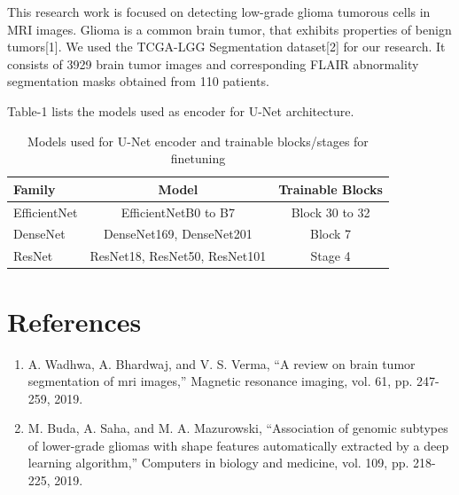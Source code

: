 \documentclass{article}
\begin{document}
This research work is focused on detecting low-grade glioma tumorous cells in MRI images. Glioma is a common brain tumor, that exhibits properties of benign tumors[1]. We used the TCGA-LGG Segmentation dataset[2] for our research. It consists of 3929 brain tumor images and corresponding FLAIR abnormality segmentation masks obtained from 110 patients.

Table-1  lists the models used as encoder for U-Net architecture.
 \begin{table}
    \centering
    \caption{Models used for U-Net encoder and trainable blocks/stages for finetuning}
    \begin{tabular}{l c c}
    \hline
    Family & Model & Trainable Blocks \\
    \hline
    EfficientNet & EfficientNetB0 to B7 & Block 30 to 32\\
    DenseNet & DenseNet169, DenseNet201 & Block 7\\
    ResNet &  ResNet18, ResNet50, ResNet101 & Stage 4\\
    \hline
    \end{tabular}
\end{table}

\section*{References}
\begin{enumerate}
    \item [1] A. Wadhwa, A. Bhardwaj, and V. S. Verma, “A review on brain tumor
    segmentation of mri images,” Magnetic resonance imaging, vol. 61, pp. 247-
    259, 2019.
  
    \item [2] M. Buda, A. Saha, and M. A. Mazurowski, “Association of genomic subtypes
    of lower-grade gliomas with shape features automatically extracted by a deep
    learning algorithm,” Computers in biology and medicine, vol. 109, pp. 218-
    225, 2019.
    
    
  
\end{enumerate}
\end{document}
